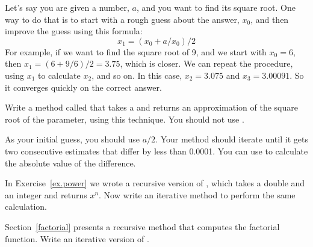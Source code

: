 \begin{exercise}

Let's say you are given a number, $a$, and you want to find its square root.
One way to do that is to start with a rough guess about the answer, $x_0$, and then improve the guess using this formula:
%
\[ x_1 =(x_0 + a/x_0) / 2 \]
%
For example, if we want to find the square root of 9, and we start with $x_0 = 6$, then $x_1 = (6 + 9/6) / 2 = 3.75$, which is closer.
We can repeat the procedure, using $x_1$ to calculate $x_2$, and so on.
In this case, $x_2 = 3.075$ and $x_3 = 3.00091$.
So it converges quickly on the correct answer.

Write a method called  that takes a  and returns an approximation of the square root of the parameter, using this technique.
You should not use .

As your initial guess, you should use $a/2$.
Your method should iterate until it gets two consecutive estimates that differ by less than 0.0001.
You can use  to calculate the absolute value of the difference.

\end{exercise}


\begin{exercise}

In Exercise~\ref{ex.power} we wrote a recursive version of , which takes a double  and an integer  and returns $x^n$.
Now write an iterative method to perform the same calculation.

\end{exercise}


\begin{exercise}

Section~\ref{factorial} presents a recursive method that computes the factorial function.
Write an iterative version of .

\end{exercise}


